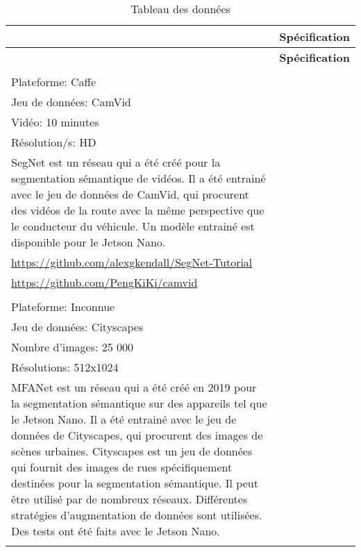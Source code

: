 {
   \newcommand\rownumber{\stepcounter{magicrownumbers}\arabic{magicrownumbers}}
   \vspace{0.1em} %
   \begin{longtable}[t]{@{}p{1em}|p{35em}} %
      \caption{Tableau des données}\label{tab:datasets}\\
      & \textbf{Spécification} \\
      \hline
      \endfirsthead
      & \textbf{Spécification} \\
      \hline
      \endhead
      \endfoot
      \endlastfoot
      \hline
      \rownumber & \begin{tabular}[t]{@{}p{35em}@{}}
         Réseau: SegNet\\Plateforme: Caffe\\Jeu de données: CamVid\\Vidéo: 10 minutes\\Résolution/s: HD\\
         \hline
         SegNet est un réseau qui a été créé pour la segmentation sémantique de vidéos. Il a été entrainé avec le jeu de données de CamVid, qui procurent des vidéos de la route avec la même perspective que le conducteur du véhicule. Un modèle entrainé est disponible pour le Jetson Nano.\\
         \url{https://github.com/alexgkendall/SegNet-Tutorial}\\\url{https://github.com/PengKiKi/camvid}
      \end{tabular}\\
      \hline
      \rownumber & \begin{tabular}[t]{@{}p{35em}@{}}
         Réseau: MFANet\\Plateforme: Inconnue\\Jeu de données: Cityscapes\\Nombre d'images: 25 000\\Résolutions: 512x1024\\
         \hline
         MFANet\parencite{zheng_real-time_2020} est un réseau qui a été créé en 2019 pour la segmentation sémantique sur des appareils tel que le Jetson Nano. Il a été entrainé avec le jeu de données de Cityscapes, qui procurent des images de scènes urbaines. Cityscapes est un jeu de données qui fournit des images de rues spécifiquement destinées pour la segmentation sémantique. Il peut être utilisé par de nombreux réseaux. Différentes stratégies d'augmentation de données sont utilisées. Des tests ont été faits avec le Jetson Nano.\\

\end{tabular}
\end{longtable}}
